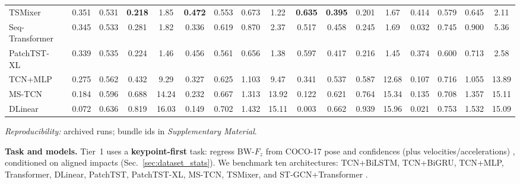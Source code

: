 \documentclass[sigconf,screen]{acmart}
\newcommand{\BadmintonGRFSupplementary}{\emph{Supplementary Material}}
\begin{document}
\begin{table}[!t]
{\begin{tabular}{@{}l cccc cccc cccc cccc@{}}
    TSMixer~\cite{chenTSMixerAllMLP2023}                      & 0.351 & 0.531 & \textbf{0.218} & 1.85 & \textbf{0.472} & 0.553 & 0.673 & 1.22 & \textbf{0.635} & \textbf{0.395} & 0.201 & 1.67 & 0.414 & 0.579 & 0.645 & 2.11 \\
    Seq-Transformer~\cite{vaswaniAttention2017}              & 0.345 & 0.533 & 0.281 & 1.82 & 0.336 & 0.619 & 0.870 & 2.37 & 0.517 & 0.458 & 0.245 & 1.69 & 0.032 & 0.745 & 0.900 & 5.36 \\
    PatchTST-XL~\cite{nieTimeSeriesWorth2023}                  & 0.339 & 0.535 & 0.224 & 1.46 & 0.456 & 0.561 & 0.656 & 1.38 & 0.597 & 0.417 & 0.216 & 1.45 & 0.374 & 0.600 & 0.713 & 2.58 \\
    TCN+MLP~\cite{baiEmpiricalEvaluationConvolutional2018}                      & 0.275 & 0.562 & 0.432 & 9.29 & 0.327 & 0.625 & 1.103 & 9.47 & 0.341 & 0.537 & 0.587 & 12.68 & 0.107 & 0.716 & 1.055 & 13.89 \\
    MS-TCN~\cite{farhaMSTCN2019}                       & 0.184 & 0.596 & 0.688 & 14.24 & 0.232 & 0.667 & 1.313 & 13.92 & 0.122 & 0.621 & 0.764 & 15.34 & 0.135 & 0.708 & 1.357 & 15.11 \\
    DLinear~\cite{zengAreTransformersEffective2023}                      & 0.072 & 0.636 & 0.819 & 16.03 & 0.149 & 0.702 & 1.432 & 15.11 & 0.003 & 0.662 & 0.939 & 15.96 & 0.021 & 0.753 & 1.532 & 15.09 \\
    \bottomrule
  \end{tabular}%
  }
  \vspace{2pt}
  {\scriptsize\setlength{\baselineskip}{10.4pt}%
  \noindent\emph{Reproducibility:} archived runs; bundle ids in \BadmintonGRFSupplementary{}.}
\end{table}

\noindent\textbf{Task and models.}
Tier~1 uses a \textbf{keypoint-first} task: regress BW-\(F_z\) from COCO-17 pose and confidences (plus velocities/accelerations) \cite{mundt2022Estimating,ishida2024Estimation,hossain2025Knowledge}, conditioned on aligned impacts (Sec.~\ref{sec:dataset_stats}).
We benchmark ten architectures: TCN+BiLSTM, TCN+BiGRU, TCN+MLP, Transformer, DLinear, PatchTST, PatchTST-XL, MS-TCN, TSMixer, and ST-GCN+Transformer \cite{baiEmpiricalEvaluationConvolutional2018,hochreiterLongShortTermMemory1997,choLearningPhraseRepresentations2014,vaswaniAttention2017,zengAreTransformersEffective2023,nieTimeSeriesWorth2023,chenTSMixerAllMLP2023,farhaMSTCN2019,shiSkeletonBasedActionRecognition2019,shiTwoStreamAdaptiveGraph2019}.
\end{document}
